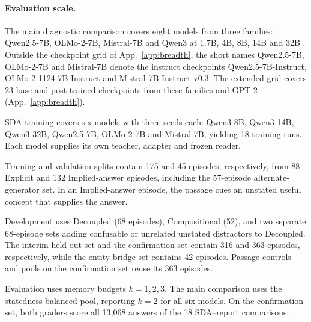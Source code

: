 \paragraph{Evaluation scale.}
\label{sec:breadth}
\label{sec:models}

The main diagnostic comparison covers eight models from three
families: Qwen2.5-7B, OLMo-2-7B, Mistral-7B and Qwen3 at 1.7B, 4B,
8B, 14B and 32B \citep{qwen2025,olmo2,jiang2023mistral,qwen3}.
Outside the checkpoint grid of App.~\ref{app:breadth}, the short
names Qwen2.5-7B, OLMo-2-7B and Mistral-7B denote the instruct
checkpoints Qwen2.5-7B-Instruct, OLMo-2-1124-7B-Instruct
and Mistral-7B-Instruct-v0.3. The extended grid covers 23 base and
post-trained checkpoints from these families and GPT-2
(App.~\ref{app:breadth}).

SDA training covers six models with three seeds each: Qwen3-8B,
Qwen3-14B, Qwen3-32B, Qwen2.5-7B, OLMo-2-7B and Mistral-7B,
yielding 18 training runs. Each model supplies its own teacher,
adapter and frozen reader.

Training and validation splits contain 175 and 45 episodes,
respectively, from 88 Explicit and 132 Implied-answer episodes,
including the 57-episode alternate-generator set. In an Implied-answer
episode, the passage cues an unstated useful concept that supplies
the answer.

Development uses Decoupled (68 episodes), Compositional (52), and two
separate 68-episode sets adding confusable or unrelated unstated
distractors to Decoupled. The interim held-out set and the confirmation
set contain 316 and 363 episodes, respectively, while the entity-bridge
set contains 42 episodes. Passage controls and pools on the
confirmation set reuse its 363 episodes.

Evaluation uses memory budgets $k=1,2,3$. The main comparison uses
the statedness-balanced pool, reporting $k=2$ for all six models.
On the confirmation set, both graders score all 13,068 answers of
the 18 SDA--report comparisons.
